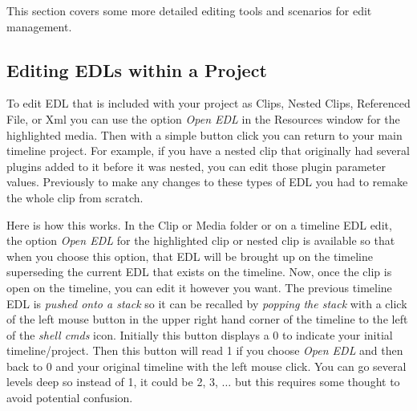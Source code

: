 This section covers some more detailed editing tools and scenarios
for edit management.

\subsection{Editing EDLs within a Project}%
\label{sub:edit-edls}

To edit EDL that is included with your project as Clips, Nested
Clips, Referenced File, or Xml you can use the option \textit{Open
  EDL} in the Resources window for the highlighted media.  Then with
a simple button click you can return to your main timeline project.
For example, if you have a nested clip that originally had several
plugins added to it before it was nested, you can edit those plugin
parameter values. Previously to make any changes to these types of
EDL you had to remake the whole clip from scratch.

Here is how this works. In the Clip or Media folder or on a timeline
EDL edit, the option \textit{Open EDL} for the highlighted clip or
nested clip is available so that when you choose this option, that
EDL will be brought up on the timeline superseding the current EDL
that exists on the timeline.  Now, once the clip is open on the
timeline, you can edit it however you want. The previous timeline
EDL is \textit{pushed onto a stack} so it can be recalled by
\textit{popping the stack} with a click of the left mouse button in
the upper right hand corner of the timeline to the left of the
\textit{shell cmds} icon.  Initially this button displays a 0 to
indicate your initial timeline/project.  Then this button will read
1 if you choose \textit{Open EDL} and then back to 0 and your
original timeline with the left mouse click.  You can go several
levels deep so instead of 1, it could be 2, 3, $\dots$ but this
requires some thought to avoid potential confusion.


